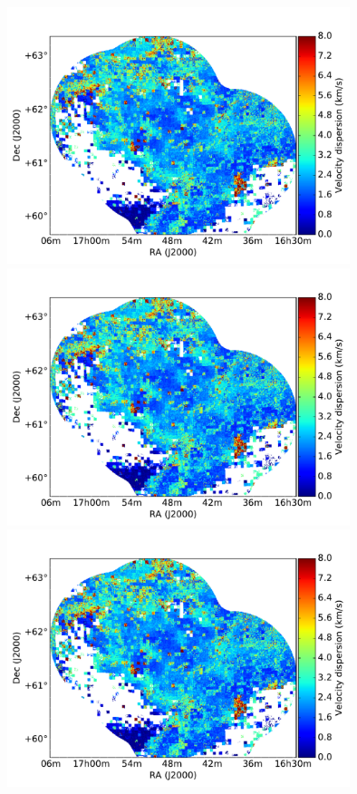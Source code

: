 \documentclass[traditabstract]{aa}
\begin{document}
\begin{figure}[h]
  \centering
  \includegraphics[page=1,height=7.5cm,trim=110 35 105 75,clip=true]{Figures/DHIGLS_disp.pdf}
  \hspace{5mm}
  \includegraphics[page=4,height=7.5cm,trim=110 35 105 75,clip=true]{Figures/DHIGLS_disp.pdf} \\
  \vspace{5mm}
  \includegraphics[page=2,height=7.5cm,trim=110 35 105 75,clip=true]{Figures/DHIGLS_disp.pdf}

\end{figure}
\end{document}
